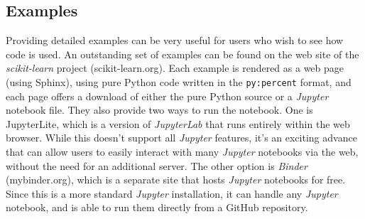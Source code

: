 \subsection{Examples}

Providing detailed examples can be very useful for users who wish to see how code is used. An outstanding set of examples can be found on the web site of the \textit{scikit-learn} project (scikit-learn.org).  Each example is rendered as a web page (using Sphinx), using pure Python code written in the \texttt{py:percent} format, and each page offers a download of either the pure Python source or a \textit{Jupyter} notebook file. They also provide two ways to run the notebook.  One is JupyterLite, which is a version of \textit{JupyterLab} that runs entirely within the web browser. While this doesn't support all \textit{Jupyter} features, it's an exciting advance that can allow users to easily interact with many \textit{Jupyter} notebooks via the web, without the need for an additional server. The other option is \textit{Binder} (mybinder.org), which is a separate site that hosts \textit{Jupyter} notebooks for free.  Since this is a more standard \textit{Jupyter} installation, it can handle any \textit{Jupyter} notebook, and is able to run them directly from a GitHub repository.